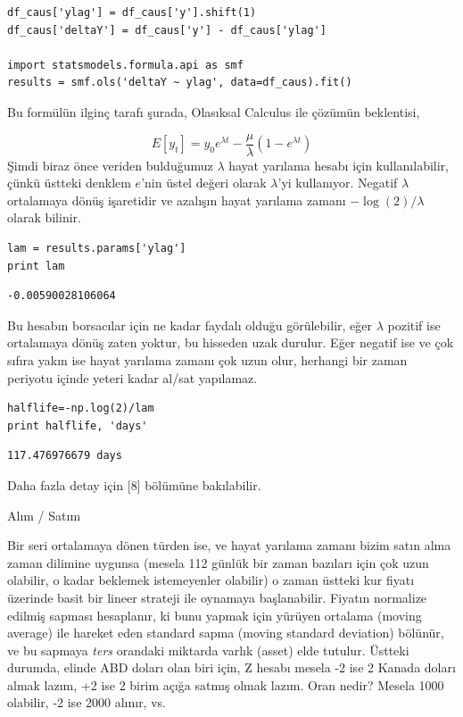 \documentclass[12pt,fleqn]{article}\usepackage{../../common}
\begin{document}
\begin{verbatim}
df_caus['ylag'] = df_caus['y'].shift(1)
df_caus['deltaY'] = df_caus['y'] - df_caus['ylag']

import statsmodels.formula.api as smf
results = smf.ols('deltaY ~ ylag', data=df_caus).fit()
\end{verbatim}

Bu formülün ilginç tarafı şurada, Olasıksal Calculus ile çözümün beklentisi,

$$ E[y_t] = y_0 e^{\lambda t} - \frac{\mu}{\lambda} ( 1 - e^{\lambda t}) $$
Şimdi biraz önce veriden bulduğumuz $\lambda$ hayat yarılama hesabı için
kullanılabilir, çünkü üstteki denklem $e$'nin üstel değeri olarak
$\lambda$'yi kullanıyor. Negatif $\lambda$ ortalamaya dönüş işaretidir ve
azalışın hayat yarılama zamanı $-\log(2)/\lambda$ olarak bilinir.

\begin{verbatim}
lam = results.params['ylag']
print lam
\end{verbatim}

\begin{verbatim}
-0.00590028106064
\end{verbatim}

Bu hesabın borsacılar için ne kadar faydalı olduğu görülebilir, eğer
$\lambda$ pozitif ise ortalamaya dönüş zaten yoktur, bu hisseden uzak
durulur. Eğer negatif ise ve çok sıfıra yakın ise hayat yarılama zamanı çok
uzun olur, herhangi bir zaman periyotu içinde yeteri kadar al/sat
yapılamaz.

\begin{verbatim}
halflife=-np.log(2)/lam
print halflife, 'days'
\end{verbatim}

\begin{verbatim}
117.476976679 days
\end{verbatim}

Daha fazla detay için [8] bölümüne bakılabilir.

Alım / Satım

Bir seri ortalamaya dönen türden ise, ve hayat yarılama zamanı bizim satın alma
zaman dilimine uygunsa (mesela 112 günlük bir zaman bazıları için çok uzun
olabilir, o kadar beklemek istemeyenler olabilir) o zaman üstteki kur fiyatı
üzerinde basit bir lineer strateji ile oynamaya başlanabilir. Fiyatın normalize
edilmiş sapması hesaplanır, ki bunu yapmak için yürüyen ortalama (moving
average) ile hareket eden standard sapma (moving standard deviation) bölünür, ve
bu sapmaya {\em ters} orandaki miktarda varlık (asset) elde tutulur. Üstteki
durumda, elinde ABD doları olan biri için, Z hesabı mesela -2 ise 2 Kanada
doları almak lazım, +2 ise 2 birim açığa satmış olmak lazım. Oran nedir? Mesela
1000 olabilir, -2 ise 2000 alınır, vs.
\end{document}

